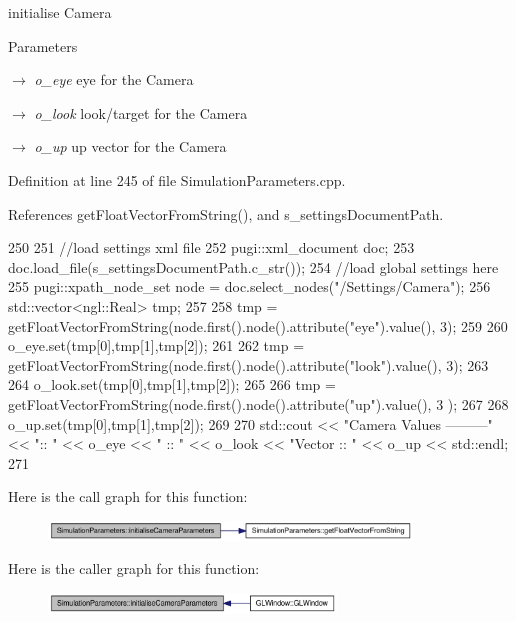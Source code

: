 initialise Camera 


\begin{DoxyParams}{Parameters}
\item[\mbox{$\rightarrow$} {\em o\_\-eye}]eye for the Camera \item[\mbox{$\rightarrow$} {\em o\_\-look}]look/target for the Camera \item[\mbox{$\rightarrow$} {\em o\_\-up}]up vector for the Camera \end{DoxyParams}


Definition at line 245 of file SimulationParameters.cpp.



References getFloatVectorFromString(), and s\_\-settingsDocumentPath.




\begin{DoxyCode}
250 {
251     //load settings xml file
252     pugi::xml_document doc;
253     doc.load_file(s_settingsDocumentPath.c_str());
254     //load global settings here
255     pugi::xpath_node_set node = doc.select_nodes("/Settings/Camera");
256     std::vector<ngl::Real> tmp;
257 
258     tmp = getFloatVectorFromString(node.first().node().attribute("eye").value(), 
      3);
259 
260     o_eye.set(tmp[0],tmp[1],tmp[2]);
261 
262     tmp = getFloatVectorFromString(node.first().node().attribute("look").value(),
       3);
263 
264     o_look.set(tmp[0],tmp[1],tmp[2]);
265 
266     tmp = getFloatVectorFromString(node.first().node().attribute("up").value(), 3
      );
267 
268     o_up.set(tmp[0],tmp[1],tmp[2]);
269 
270     std::cout << "\n Camera Values ---------" << "\tEye :: " << o_eye << "\tLook 
      :: " << o_look << "\tUp Vector :: " << o_up << std::endl;
271 }
\end{DoxyCode}




Here is the call graph for this function:\nopagebreak
\begin{figure}[H]
\begin{center}
\leavevmode
\includegraphics[width=274pt]{class_simulation_parameters_a95fed9bc4d0fec10543b5550f06e80ff_cgraph}
\end{center}
\end{figure}




Here is the caller graph for this function:\nopagebreak
\begin{figure}[H]
\begin{center}
\leavevmode
\includegraphics[width=217pt]{class_simulation_parameters_a95fed9bc4d0fec10543b5550f06e80ff_icgraph}
\end{center}
\end{figure}


